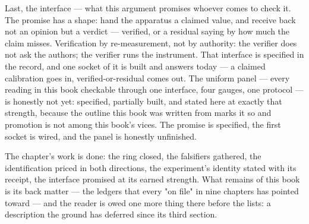 Last, the interface --- what this argument promises whoever comes to check it.
The promise has a shape: hand the apparatus a claimed value, and receive back not
an opinion but a verdict --- verified, or a residual saying by how much the claim
misses. Verification by re-measurement, not by authority: the verifier does not
ask the authors; the verifier runs the instrument. That interface is specified in
the record, and one socket of it is built and answers today --- a claimed
calibration goes in, verified-or-residual comes out. The uniform panel --- every
reading in this book checkable through one interface, four gauges, one protocol
--- is honestly not yet: specified, partially built, and stated here at exactly
that strength, because the outline this book was written from marks it so and
promotion is not among this book's vices. The promise is specified, the first
socket is wired, and the panel is honestly unfinished.

The chapter's work is done: the ring closed, the falsifiers gathered, the
identification priced in both directions, the experiment's identity stated with
its receipt, the interface promised at its earned strength. What remains of this
book is its back matter --- the ledgers that every "on file" in nine chapters has
pointed toward --- and the reader is owed one more thing there before the lists:
a description the ground has deferred since its third section.
